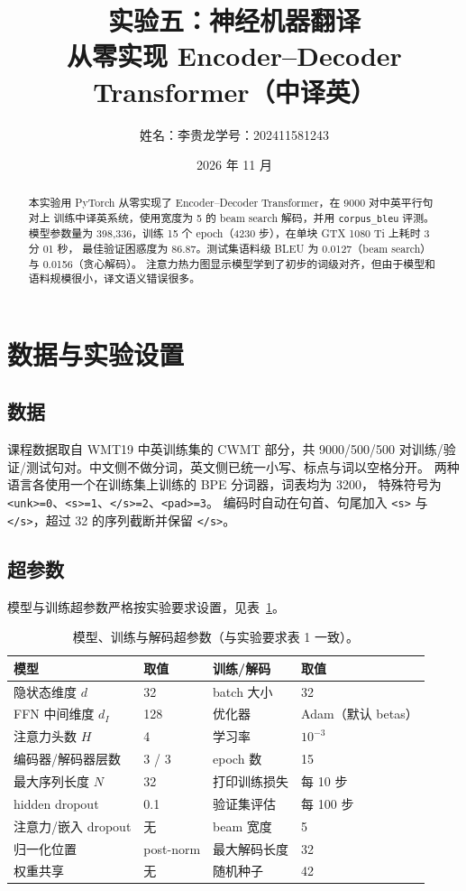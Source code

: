 \documentclass[UTF8,a4paper,11pt]{ctexart}
\title{实验五：神经机器翻译\\[2pt]
\large 从零实现 Encoder--Decoder Transformer（中译英）}
\author{姓名：李贵龙\quad 学号：202411581243}
\date{2026 年 11 月}
\begin{document}
\maketitle

\begin{abstract}
本实验用 PyTorch 从零实现了 Encoder--Decoder Transformer，在 9000 对中英平行句对上
训练中译英系统，使用宽度为 5 的 beam search 解码，并用 \texttt{corpus\_bleu} 评测。
模型参数量为 398{,}336，训练 15 个 epoch（4230 步），在单块 GTX 1080 Ti 上耗时 3 分 01 秒，
最佳验证困惑度为 86.87。测试集语料级 BLEU 为 0.0127（beam search）与 0.0156（贪心解码）。
注意力热力图显示模型学到了初步的词级对齐，但由于模型和语料规模很小，译文语义错误很多。
\end{abstract}

\section{数据与实验设置}

\subsection{数据}
课程数据取自 WMT19 中英训练集的 CWMT 部分\citep{barrault2019wmt19}，共
9000/500/500 对训练/验证/测试句对。中文侧不做分词，英文侧已统一小写、标点与词以空格分开。
两种语言各使用一个在训练集上训练的 BPE 分词器\citep{sennrich2016bpe}，词表均为 3200，
特殊符号为 \texttt{<unk>=0}、\texttt{<s>=1}、\texttt{</s>=2}、\texttt{<pad>=3}。
编码时自动在句首、句尾加入 \texttt{<s>} 与 \texttt{</s>}，超过 32 的序列截断并保留
\texttt{</s>}。

\subsection{超参数}
模型与训练超参数严格按实验要求设置，见表~\ref{tab:hparams}。

\begin{table}[H]
\centering
\caption{模型、训练与解码超参数（与实验要求表 1 一致）。}
\label{tab:hparams}
\begin{tabular}{llll}
\toprule
模型 & 取值 & 训练/解码 & 取值 \\
\midrule
隐状态维度 $d$ & 32 & batch 大小 & 32 \\
FFN 中间维度 $d_I$ & 128 & 优化器 & Adam（默认 betas） \\
注意力头数 $H$ & 4 & 学习率 & $10^{-3}$ \\
编码器/解码器层数 & 3 / 3 & epoch 数 & 15 \\
最大序列长度 $N$ & 32 & 打印训练损失 & 每 10 步 \\
hidden dropout & 0.1 & 验证集评估 & 每 100 步 \\
注意力/嵌入 dropout & 无 & beam 宽度 & 5 \\
归一化位置 & post-norm & 最大解码长度 & 32 \\
权重共享 & 无 & 随机种子 & 42 \\
\bottomrule
\end{tabular}
\end{table}
\end{document}
